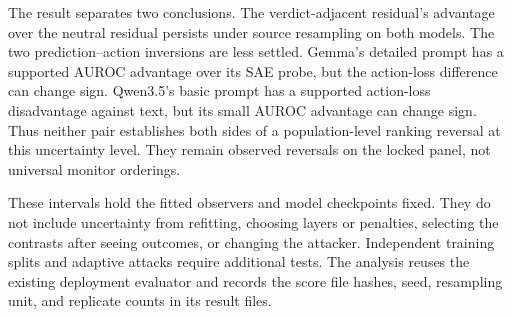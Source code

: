 The result separates two conclusions. The verdict-adjacent residual's
advantage over the neutral residual persists under source resampling on both
models. The two prediction--action inversions are less settled. Gemma's
detailed prompt has a supported AUROC advantage over its SAE probe, but the
action-loss difference can change sign. Qwen3.5's basic prompt has a supported
action-loss disadvantage against text, but its small AUROC advantage can
change sign. Thus neither pair establishes both sides of a population-level
ranking reversal at this uncertainty level. They remain observed reversals
on the locked panel, not universal monitor orderings.

These intervals hold the fitted observers and model checkpoints fixed. They
do not include uncertainty from refitting, choosing layers or penalties,
selecting the contrasts after seeing outcomes, or changing the attacker.
Independent training splits and adaptive attacks require additional tests.
The analysis reuses the existing deployment evaluator and records the score
file hashes, seed, resampling unit, and replicate counts in its result files.
